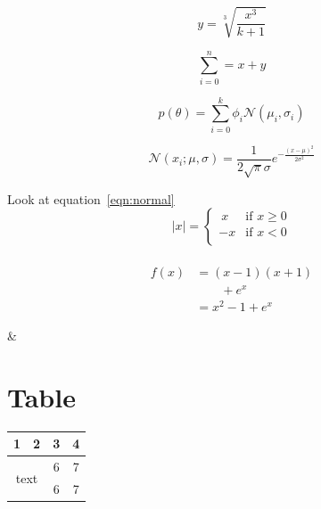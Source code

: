 \documentclass[28pt,a4paper]{article}
\begin{document}
\begin{equation}
    y=\sqrt[3]{\frac{x^3}{k+1}}
\end{equation}

\begin{equation}
    \sum_{i=0}^n=x+y
\end{equation}

\begin{equation}
    p(\theta) = \sum_{i=0}^k \phi_i \mathcal{N}(\mu_i,\sigma_i)
\end{equation}

\begin{equation}\label{eqn:normal}
    \mathcal{N}(x_i;\mu, \sigma) = \frac{1}{2\sqrt{\pi}\sigma}e^{-\frac{(x-\mu)^2}{2\sigma^2}}
\end{equation}

Look at equation~\eqref{eqn:normal}\\

\begin{equation}
    |x| =
    \begin{cases}
    \ x & \text{if } x \geq 0 \\
    -x & \text{if } x < 0 \\
    \end{cases}
\end{equation} \\

\begin{align}
    f(x)
    & = (x-1)(x+1) \nonumber\\
    & \qquad +e^x \nonumber\\
    & = x^2 -1 + e^x
\end{align}

\& \\

\section{Table}

\begin{tabular}{|c | c | c | c|}
    \hline
     1&2&3&4  \\
     \hline
     \multicolumn{2}{c|}{\multirow{2}{*}{text}}&6&7 \\ 
     \cline{3-4}
     \multicolumn{2}{|c|}{}&6&7 \\ 
     \hline
\end{tabular}\\
\end{document}
